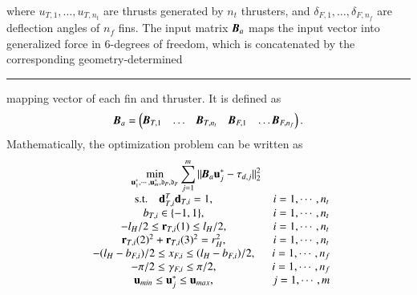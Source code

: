 where $u_{T,1},\ldots,u_{T,n_{t}}$ are thrusts generated by $n_{t}$ thrusters, and $\delta_{F,1},\ldots,\delta_{F,n_{f}}$ are deflection angles of $n_{f}$ fins. The input matrix
$ \emph{\textbf{B}}_{a}$ maps the input vector into generalized force in 6-degrees of freedom, which is concatenated by the corresponding geometry-determined
\begin{center}
\rule{\linewidth}{0.1mm}
\end{center} 
mapping vector of each fin and thruster. It is defined as   
\begin{align}
 \emph{\textbf{B}}_{a}=\begin{pmatrix}
\emph{\textbf{B}}_{T,1}&\ldots&\emph{\textbf{B}}_{T,n_{t}}&\emph{\textbf{B}}_{F,1}&\ldots 
\emph{\textbf{B}}_{F,n_{f}}
\end{pmatrix}. 
\end{align}
Mathematically, the optimization problem can be written as  
\begin{equation}
\begin{array}{ccclcl}
\displaystyle \qquad \qquad \min_{\vec{u}^{*}_{1}, \cdots, \vec{u}^{*}_{m},\mathfrak{d}_{P},\mathfrak{d}_{F}}  \sum_{j=1}^{m}||\emph{\textbf{B}}_{a}\vec{u}^{*}_{j}-\vec{\tau}_{d,j}||^{2}_{2} \\
\textrm{s.t.}  \quad \vec{d}_{T,i}^{T} \vec{d}_{T,i} =  1, &i=1, \cdots, n_{t} \\
b_{T,i} \in \lbrace -1,1 \rbrace, &i=1, \cdots, n_{t} \\
-l_{H}/2\leq \vec{r}_{T,i}(1) \leq l_{H}/2, &i=1, \cdots, n_{t} \\
\vec{r}_{T,i}(2)^{2}+\vec{r}_{T,i}(3)^{2} =r_{H}^{2}, &i=1, \cdots, n_{t} \\
 -(l_{H}-b_{F,i})/2\leq x_{F,i} \leq (l_{H}-b_{F,i})/2, &i=1, \cdots, n_{f} \\
 -\pi /2\leq \gamma_{F,i} \leq \pi/2, &i=1, \cdots, n_{f} \\
 \vec{u}_{min}\leq \vec{u}_{j}^{*}  \leq \vec{u}_{max}, &j=1, \cdots, m
\end{array} \label{EQ:OPT}
\end{equation}

